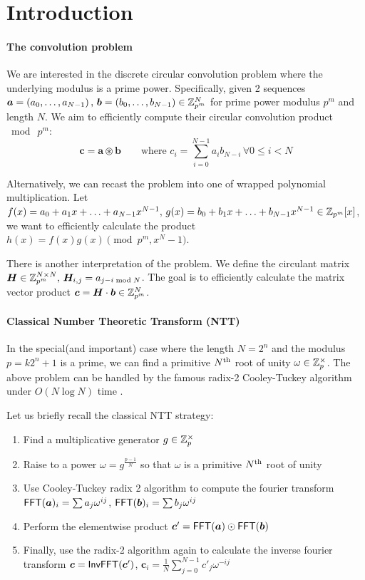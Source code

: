 \section{Introduction}
\paragraph{The convolution problem}
We are interested in the discrete circular convolution problem where the underlying modulus is a prime power. Specifically, given 2 sequences \(\bm{a} = \left({a}_0, \ldots, {a}_{N - 1}\right) ,\, \bm{b} = \left({b}_0, \ldots, {b}_{N - 1}\right) \in \mathbb{Z}_{p^m}^N\) for prime power modulus \(p^m\) and length \(N\). We aim to efficiently compute their circular convolution product \(\bmod \  p^m\):
\[\bm{c} = \bm{a} \circledast \bm{b} \qquad \text{where } c_i = \sum_{i=0}^{N-1}a_i b_{N-i} \, \forall 0 \le i < N\]

\ifFullVersion
Alternatively, we can recast the problem into one of wrapped polynomial multiplication. Let \(f(x) = a_0 + a_1 x + \ldots + a_{N-1}x^{N-1},\, g(x) = b_0 + b_1 x + \ldots + b_{N-1}x^{N-1} \in \mathbb{Z}_{p^m}[x]\), we want to efficiently calculate the product \(h(x) = f(x)g(x) \pmod{p^m, x^N - 1}\).

There is another interpretation of the problem. We define the circulant matrix \(\bm{H} \in \mathbb{Z}_{p^m}^{N \times N},\, \bm{H}_{i,j} = a_{j - i \bmod N}\). The goal is to efficiently calculate the matrix vector product \(\bm{c} = \bm{H} \cdot \bm{b} \in \mathbb{Z}_{p^m}^N\).
\fi

\paragraph{Classical Number Theoretic Transform (NTT)}
In the special(and important) case where the length \(N = 2^n\) and the modulus \(p = k2^n + 1\) is a prime, we can find a primitive \(N\textsuperscript{th}\) root of unity \(\omega \in \mathbb{Z}_p^{\times}\). The above problem can be handled by the famous radix-2 Cooley-Tuckey algorithm under \(O(N \log N)\) time \cite{IEEE:Cooley67}. 

\ifFullVersion
Let us briefly recall the classical NTT strategy:
\begin{enumerate}
    \item Find a multiplicative generator \(g \in \mathbb{Z}_p^{\times}\)
    \item Raise to a power \(\omega = g^{\frac{p-1}{N}}\) so that \(\omega\) is a primitive \(N\textsuperscript{th}\) root of unity
    \item Use Cooley-Tuckey radix 2 algorithm to compute the fourier transform \(\mathsf{FFT}(\bm{a})_i = \sum a_j \omega^{ij}\), \(\mathsf{FFT}(\bm{b})_i = \sum b_j \omega^{ij}\)
    \item Perform the elementwise product \(\bm{c}' = \mathsf{FFT}(\bm{a}) \odot \mathsf{FFT}(\bm{b})\)
    \item Finally, use the radix-2 algorithm again to calculate the inverse fourier transform \(\bm{c} = \mathsf{InvFFT}(\bm{c}')\), \(\bm{c}_i = \frac{1}{N}\sum_{j=0}^{N-1}c'_j \omega^{-ij}\)
\end{enumerate}
\fi

